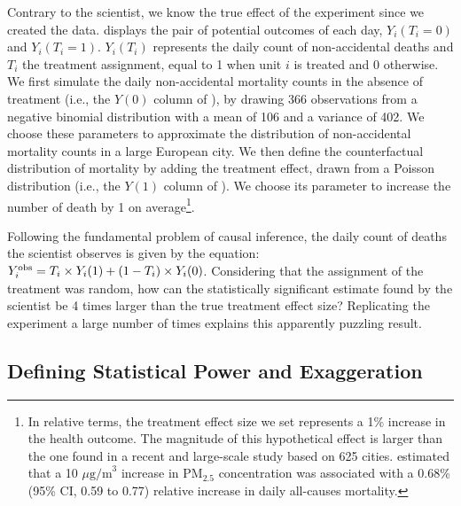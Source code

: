 \documentclass[12pt]{article}
\begin{document}
    Contrary to the scientist, we know the true effect of the experiment since we created the data.  displays the pair of potential outcomes of each day, $Y_{i}(T_{i}=0)$ and $Y_{i}(T_{i}=1)$. $Y_{i}(T_{i})$ represents the daily count of non-accidental deaths and $T_{i}$ the treatment assignment, equal to 1 when unit $i$ is treated and 0 otherwise. We first simulate the daily non-accidental mortality counts in the absence of treatment (i.e., the $Y(0)$ column of ), by drawing 366 observations from a negative binomial distribution with a mean of 106 and a variance of 402. We choose these parameters to approximate the distribution of non-accidental mortality counts in a large European city. We then define the counterfactual distribution of mortality by adding the treatment effect, drawn from a Poisson distribution (i.e., the $Y(1)$ column of ). We choose its parameter to increase the number of death by 1 on average\footnote{In relative terms, the treatment effect size we set represents a 1\% increase in the health outcome. The magnitude of this hypothetical effect is larger than the one found in a recent and large-scale study based on 625 cities. \cite{liu_ambient_2019} estimated that a 10 $\mu \text{g/m}^3$ increase in $\text{PM}_{2.5}$ concentration was associated with a 0.68\% (95\% CI, 0.59 to 0.77) relative increase in daily all-causes mortality.}.

    

    Following the fundamental problem of causal inference, the daily count of deaths the scientist observes is given by the equation: $Y_{i}^{\textnormal{obs}} = T_{i} \times Y_{i}(1) + (1-T_{i})\times Y_{i}(0)$. Considering that the assignment of the treatment was random, how can the statistically significant estimate found by the scientist be 4 times larger than the true treatment effect size? Replicating the experiment a large number of times explains this apparently puzzling result.
   
        \begin{sloppypar}
    \subsection{Defining Statistical Power and Exaggeration}
        \end{sloppypar}
\end{document}
